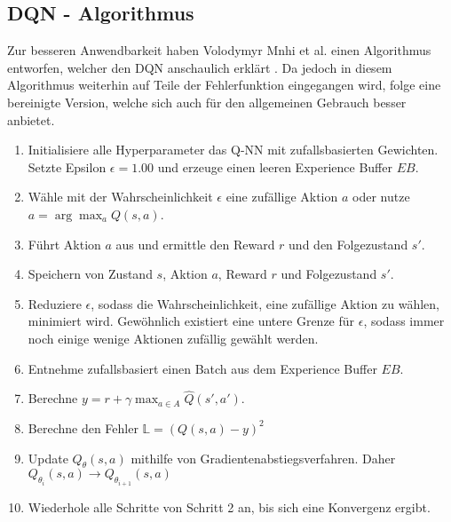 \subsection{DQN - Algorithmus} \label{subsec:Grundlagen_DQN_Algorithmus}
Zur besseren Anwendbarkeit haben Volodymyr Mnhi et al. einen Algorithmus entworfen, welcher den DQN anschaulich erklärt \citep{DBLP:journals/corr/MnihKSGAWR13}. Da jedoch in diesem Algorithmus weiterhin auf Teile der Fehlerfunktion eingegangen wird, folge eine bereinigte Version, welche sich auch für den allgemeinen Gebrauch besser anbietet. \citep[S. 149 f.]{DRL_Lapan}
\begin{enumerate} 
	\item Initialisiere alle Hyperparameter das Q-NN mit zufallsbasierten Gewichten. Setzte Epsilon $\epsilon = 1.00$ und erzeuge einen leeren Experience Buffer $EB$.
	\item Wähle mit der Wahrscheinlichkeit $\epsilon$ eine zufällige Aktion $a$ oder nutze $a = \arg\max_{a} Q(s,a)$.
	\item Führt Aktion $a$ aus und ermittle den Reward $r$ und den Folgezustand $s'$.
	\item Speichern von Zustand $s$, Aktion $a$, Reward $r$ und Folgezustand $s'$.
	\item Reduziere $\epsilon$, sodass die Wahrscheinlichkeit, eine zufällige Aktion zu wählen, minimiert wird. Gewöhnlich existiert eine untere Grenze für $\epsilon$, sodass immer noch einige wenige Aktionen zufällig gewählt werden.
	\item Entnehme zufallsbasiert einen Batch aus dem Experience Buffer $EB$.
	\item Berechne $y = r + \gamma \max_{a \in A}\hat{Q}(s',a')$.
	\item Berechne den Fehler $\mathbb{L} = (Q(s,a) - y)^2$
	\item Update $Q_\theta(s,a)$ mithilfe von Gradientenabstiegsverfahren. Daher $Q_{\theta_{i}}(s,a) \longrightarrow Q_{\theta_{i+1}}(s,a)$
	\item Wiederhole alle Schritte von Schritt 2 an, bis sich eine Konvergenz ergibt.
\end{enumerate}
